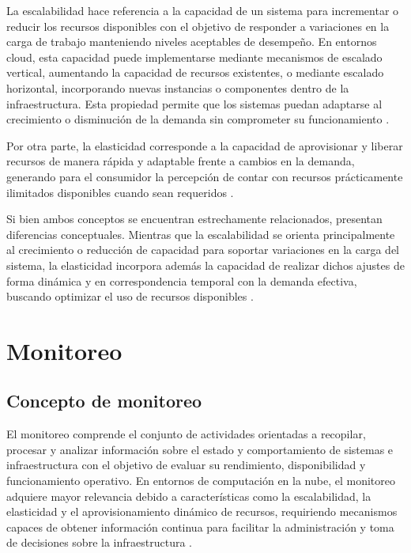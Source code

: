 La escalabilidad hace referencia a la capacidad de un sistema para incrementar o reducir los recursos disponibles con el objetivo de responder a variaciones en la carga de trabajo manteniendo niveles aceptables de desempeño. En entornos cloud, esta capacidad puede implementarse mediante mecanismos de escalado vertical, aumentando la capacidad de recursos existentes, o mediante escalado horizontal, incorporando nuevas instancias o componentes dentro de la infraestructura. Esta propiedad permite que los sistemas puedan adaptarse al crecimiento o disminución de la demanda sin comprometer su funcionamiento \parencite{Ullah2018}.

Por otra parte, la elasticidad corresponde a la capacidad de aprovisionar y liberar recursos de manera rápida y adaptable frente a cambios en la demanda, generando para el consumidor la percepción de contar con recursos prácticamente ilimitados disponibles cuando sean requeridos \parencite{Mell2011}.

Si bien ambos conceptos se encuentran estrechamente relacionados, presentan diferencias conceptuales. Mientras que la escalabilidad se orienta principalmente al crecimiento o reducción de capacidad para soportar variaciones en la carga del sistema, la elasticidad incorpora además la capacidad de realizar dichos ajustes de forma dinámica y en correspondencia temporal con la demanda efectiva, buscando optimizar el uso de recursos disponibles \parencite{Ullah2018, Mell2011}.

\section{Monitoreo}

\subsection{Concepto de monitoreo}

El monitoreo comprende el conjunto de actividades orientadas a recopilar, procesar y analizar información sobre el estado y comportamiento de sistemas e infraestructura con el objetivo de evaluar su rendimiento, disponibilidad y funcionamiento operativo. En entornos de computación en la nube, el monitoreo adquiere mayor relevancia debido a características como la escalabilidad, la elasticidad y el aprovisionamiento dinámico de recursos, requiriendo mecanismos capaces de obtener información continua para facilitar la administración y toma de decisiones sobre la infraestructura \parencite{Ward2014}.


